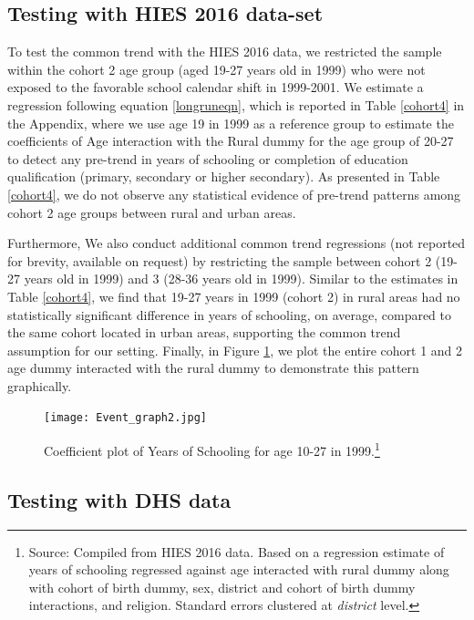 \documentclass[12pt,letterpaper]{article}
\newcommand{\0}{\ensuremath{\mbox{\boldmath $0$}}}
\begin{document}
\subsection{Testing with HIES 2016 data-set\label{subsec.cohort_trend_HIES}}
To test the common trend with the HIES 2016 data, we restricted the sample within the cohort 2 age group (aged 19-27 years old in 1999) who were not exposed to the favorable school calendar shift in 1999-2001. We estimate a regression following equation \ref{longruneqn}, which is reported in Table \ref{cohort4} in the Appendix, where we use age 19 in 1999 as a reference group to estimate the coefficients of Age interaction with the Rural dummy for the age group of 20-27 to detect any pre-trend in years of schooling or completion of education qualification (primary, secondary or higher secondary). As presented in Table \ref{cohort4}, we do not observe any statistical evidence of pre-trend patterns among cohort 2 age groups between rural and urban areas. 
   
Furthermore, We also conduct additional common trend regressions (not reported for brevity, available on request) by restricting the sample between cohort 2 (19-27 years old in 1999) and 3 (28-36 years old in 1999). Similar to the estimates in Table \ref{cohort4}, we find that 19-27 years in 1999 (cohort 2) in rural areas had no statistically significant difference in years of schooling, on average, compared to the same cohort located in urban areas, supporting the common trend assumption for our setting. Finally, in Figure \ref{event_graph}, we plot the entire cohort 1 and 2 age dummy interacted with the rural dummy to demonstrate this pattern graphically.  

\begin{figure}[h!]
\centering
\texttt{[image: Event\_graph2.jpg]}\\
\caption{Coefficient plot of Years of Schooling for age 10-27 in 1999.\footnote{Source: Compiled from HIES 2016 data. Based on a regression estimate of years of schooling regressed against age interacted with rural dummy along with cohort of birth dummy, sex, district and cohort of birth dummy interactions, and religion. Standard errors clustered at \textit{district} level.}}
\label{event_graph}
\end{figure}


\subsection{Testing with DHS data\label{subsec.cohort_trend_DHS}}
\end{document}
